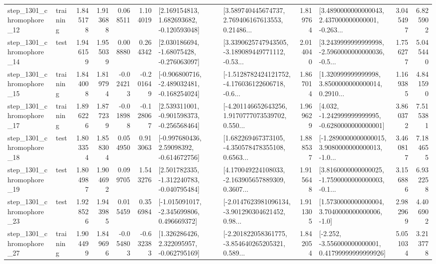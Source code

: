 \begin{tabular}{llrrrrllrlrr}
 step\_1301\_chromophore\_12 &  training &      1.845178 &    1.913688 &      0.068511 &  1.104019 &    [2.169154813, 1.682693682, -0.120593048] &  [3.589740445674737, 2.769406167613553, 0.21486... &       1.819764 &  [3.4890000000000043, 2.437000000000001, -0.263... &            3.045497 &          6.825902 \\
 step\_1301\_chromophore\_14 &      test &      1.946159 &    1.955039 &      0.008880 &  0.264342 &    [2.030186694, -1.68075428, -0.276063097] &  [3.3390625747943505, -3.189089449771112, -0.53... &       2.014040 &  [3.2439999999999998, -2.5960000000000036, -0.5... &            1.756277 &          5.045440 \\
 step\_1301\_chromophore\_15 &  training &      1.844008 &    1.819794 &     -0.024213 & -0.201649 &  [-0.906800716, -2.489032481, -0.168254024] &  [-1.5128782424121752, -4.176036122606718, -0.6... &       1.867014 &  [1.320999999999998, 3.8500000000000014, 0.2910... &            1.169385 &          4.841590 \\
 step\_1301\_chromophore\_17 &  training &      1.896226 &    1.877239 &     -0.018988 & -0.128067 &   [2.539311001, -0.901598373, -0.256568464] &  [-4.201146652643256, 1.9170777073539702, 0.550... &       1.969629 &   [4.032, -1.242999999999995, -0.6280000000000001] &            3.860372 &          7.515381 \\
 step\_1301\_chromophore\_18 &      test &      1.803354 &    1.858304 &      0.054950 &  0.913063 &    [-0.997680436, 2.59098392, -0.614672756] &  [1.682269467373105, -4.350578478355108, 0.6563... &       1.888537 &  [-1.2890000000000015, 3.9080000000000013, -1.0... &            3.460817 &          7.184655 \\
 step\_1301\_chromophore\_19 &      test &      1.804987 &    1.904692 &      0.099705 &  1.543276 &   [2.501782335, -1.312240783, -0.040795484] &  [4.170049224108033, -2.163905657889309, 0.3607... &       1.915648 &  [3.8160000000000025, -1.7590000000000003, -0.1... &            3.156886 &          6.932258 \\
 step\_1301\_chromophore\_23 &      test &      1.928526 &    1.943985 &      0.015459 &  0.356984 &   [-1.015091017, -2.345699806, 0.496669372] &  [-2.0147623981096134, -3.901290304621452, 0.98... &       1.911305 &     [1.5730000000000004, 3.7040000000000006, -1.0] &            2.982969 &          4.406902 \\
 step\_1301\_chromophore\_27 &  training &      1.904499 &    1.849696 &     -0.054803 & -0.632383 &    [1.326286426, 2.322095957, -0.062795169] &  [-2.201822058361775, -3.854640265205321, 0.589... &       1.842054 &  [-2.252, -3.556000000000001, 0.41799999999999926] &            5.051034 &          3.213778 \\

\end{tabular}
